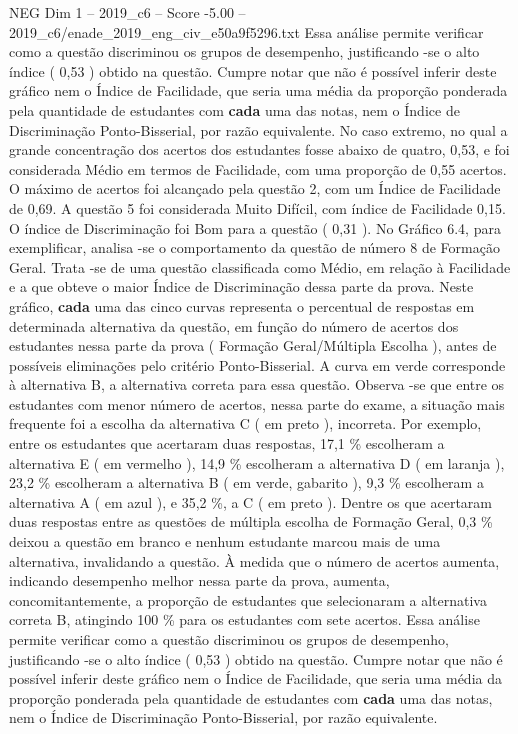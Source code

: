 \begin{textsample}{NEG Dim 1 – 2019\_c6 – Score -5.00 – 2019\_c6/enade\_2019\_eng\_civ\_e50a9f5296.txt}
Essa análise permite verificar como a questão discriminou os grupos de desempenho, justificando -se o alto índice ( 0,53 ) obtido na questão.
Cumpre notar que não é possível inferir deste gráfico nem o Índice de Facilidade, que seria uma média da proporção ponderada pela quantidade de estudantes com \textbf{cada} uma das notas, nem o Índice de Discriminação Ponto-Bisserial, por razão equivalente.
No caso extremo, no qual a grande concentração dos acertos dos estudantes fosse abaixo de quatro, 0,53, e foi considerada Médio em termos de Facilidade, com uma proporção de 0,55 acertos.
O máximo de acertos foi alcançado pela questão 2, com um Índice de Facilidade de 0,69.
A questão 5 foi considerada Muito Difícil, com índice de Facilidade 0,15.
O índice de Discriminação foi Bom para a questão ( 0,31 ).
No Gráfico 6.4, para exemplificar, analisa -se o comportamento da questão de número 8 de Formação Geral.
Trata -se de uma questão classificada como Médio, em relação à Facilidade e a que obteve o maior Índice de Discriminação dessa parte da prova.
Neste gráfico, \textbf{cada} uma das cinco curvas representa o percentual de respostas em determinada alternativa da questão, em função do número de acertos dos estudantes nessa parte da prova ( Formação Geral/Múltipla Escolha ), antes de possíveis eliminações pelo critério Ponto-Bisserial.
A curva em verde corresponde à alternativa B, a alternativa correta para essa questão.
Observa -se que entre os estudantes com menor número de acertos, nessa parte do exame, a situação mais frequente foi a escolha da alternativa C ( em preto ), incorreta.
Por exemplo, entre os estudantes que acertaram duas respostas, 17,1 \% escolheram a alternativa E ( em vermelho ), 14,9 \% escolheram a alternativa D ( em laranja ), 23,2 \% escolheram a alternativa B ( em verde, gabarito ), 9,3 \% escolheram a alternativa A ( em azul ), e 35,2 \%, a C ( em preto ).
Dentre os que acertaram duas respostas entre as questões de múltipla escolha de Formação Geral, 0,3 \% deixou a questão em branco e nenhum estudante marcou mais de uma alternativa, invalidando a questão.
À medida que o número de acertos aumenta, indicando desempenho melhor nessa parte da prova, aumenta, concomitantemente, a proporção de estudantes que selecionaram a alternativa correta B, atingindo 100 \% para os estudantes com sete acertos.
Essa análise permite verificar como a questão discriminou os grupos de desempenho, justificando -se o alto índice ( 0,53 ) obtido na questão.
Cumpre notar que não é possível inferir deste gráfico nem o Índice de Facilidade, que seria uma média da proporção ponderada pela quantidade de estudantes com \textbf{cada} uma das notas, nem o Índice de Discriminação Ponto-Bisserial, por razão equivalente.

\end{textsample}
